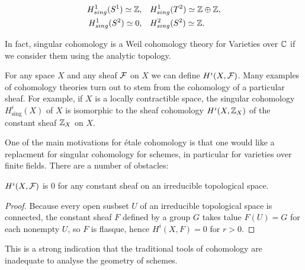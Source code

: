 \begin{align*}
	H^1_{sing}(S^1) \simeq \mathbb{Z},\quad & H^1_{sing}(T^2) \simeq \mathbb{Z} \oplus \mathbb{Z}, \\
	H^1_{sing}(S^2) \simeq  0,\quad & H^2_{sing}(S^2) \simeq \mathbb{Z}.
\end{align*}

In fact, singular cohomology is a Weil cohomology theory for Varieties over $\mathbb{C}$ if we consider them using the analytic topology.

For any space $X$ and any sheaf $\mathcal{F}$ on $X$ we can define $H^i(X, \mathcal{F})$. Many examples of cohomology theories turn out to stem from the cohomology of a particular sheaf. For example, if $X$ is a locally contractible space, the singular cohomology $H_{\text{sing}}^i(X)$ of $X$ is isomorphic to the sheaf cohomology $H^i(X, \mathbb{Z}_X)$ of the constant sheaf $\mathbb{Z}_X$ on $X$.

One of the main motivations for \'etale cohomology is that one would like a replacment for singular cohomology for schemes, in particular for varieties over finite fields. There are a number of obstacles:

\begin{proposition}
	$H^i(X, \mathcal{F})$ is 0 for any constant sheaf on an irreducible topological space.
\end{proposition}

\begin{proof}
	Because every open susbset $U$ of an irreducible topological space is connected, the constant sheaf $F$ defined by a group $G$ takes talue $F(U) = G$ for each nonempty $U$, so $F$ is flasque, hence $H^i(X,F) = 0$ for $r>0$.
\end{proof}

This is a strong indication that the traditional tools of cohomology are inadequate to analyse the geometry of schemes.














